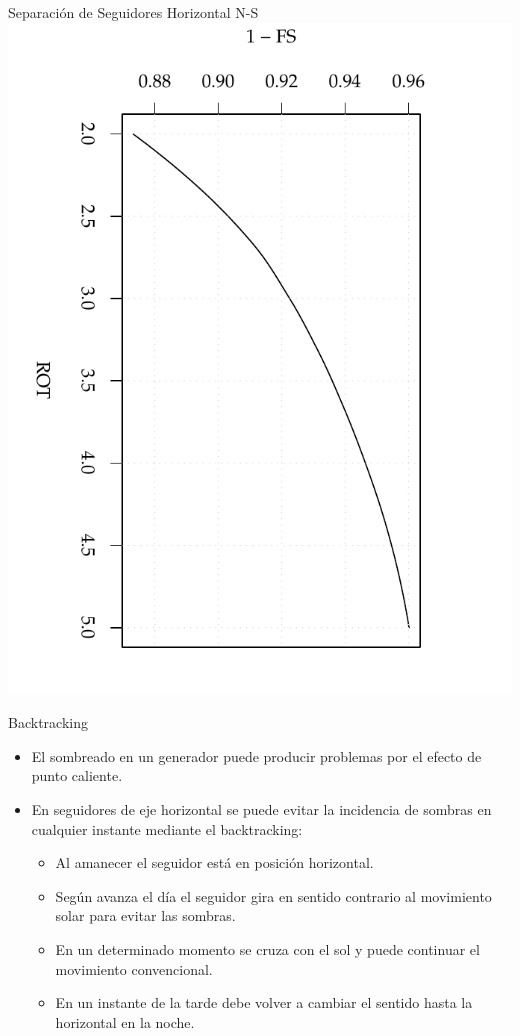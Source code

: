 \documentclass[xcolor={usenames,svgnames,dvipsnames}]{beamer}
\begin{document}
\begin{frame}[label=sec-2-4-2]{Separación de Seguidores Horizontal N-S}
\includegraphics[angle=90,width=.9\linewidth]{../figs/AbacoSeguidorHorizSombra_Ene10.pdf}
\end{frame}

\begin{frame}[label=sec-2-4-3]{Backtracking}
\begin{itemize}
\item El \alert{sombreado} en un generador puede producir problemas por el efecto
de \alert{punto caliente}.

\item En seguidores de eje horizontal se puede \alert{evitar la incidencia de
sombras} en cualquier instante mediante el \guillemotleft{}\alert{backtracking}\guillemotright{}:

\begin{itemize}
\item Al \alert{amanecer} el seguidor está en posición \alert{horizontal}.

\item Según avanza el día el seguidor gira en \alert{sentido contrario al
movimiento solar para evitar las sombras}.

\item En un determinado momento se cruza con el sol y puede continuar el
movimiento \guillemotleft{}convencional\guillemotright{}.

\item En un instante de la tarde debe volver a cambiar el sentido hasta
la \alert{horizontal en la noche}.
\end{itemize}
\end{itemize}
\end{frame}
\end{document}
